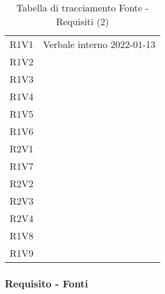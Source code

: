 \begin{table}[!htbp]
\begin{tabular}{ m{}<{\centering}  m{}<{\centering} }
R1V1 & Verbale interno 2022-01-13 \\	

	R1V2 &  \Vi \\	
	 
	R1V3 & \Vi \\	

	R1V4 & \Vi \\	
	 
	R1V5 & \Vi \\	
	 
	R1V6 & \Ca \\	
	 
	R2V1 & \Vi \\
	
	R1V7 & \Ca \\	
	 
	R2V2 & \\	 

	R2V3 & \Vi \\	
	 
	R2V4 & \Vi \\	
	 
	R1V8 & \Ca \\	
	 
	R1V9 & \Ve \\	

\end{tabular}
\caption{Tabella di tracciamento Fonte - Requisiti (2)}
\end{table}

\subsubsection{Requisito - Fonti}

